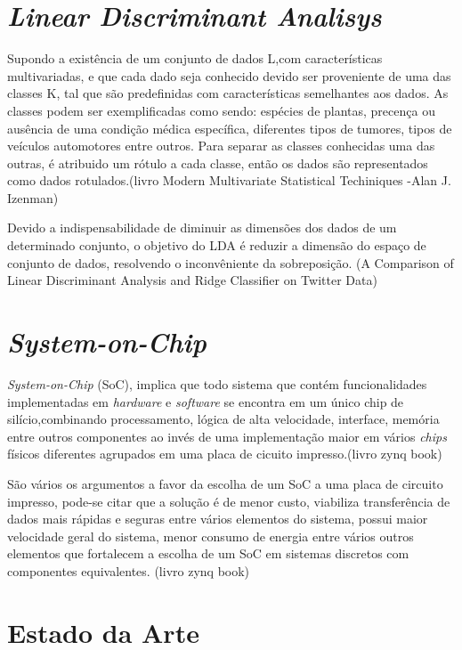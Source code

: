 \section{\textit{Linear Discriminant Analisys}}
Supondo a existência de um conjunto de dados L,com características multivariadas, e que cada dado
seja conhecido devido ser proveniente de uma das  classes K, tal que são predefinidas com características
semelhantes aos dados. As classes podem ser exemplificadas como sendo: espécies de plantas,
precença ou ausência de uma condição médica específica, diferentes tipos de tumores, tipos de veículos automotores
entre outros. Para separar as classes conhecidas uma das outras, é atribuido um rótulo a cada classe, então os dados são
representados como dados rotulados.(livro Modern Multivariate
Statistical Techiniques -Alan J. Izenman)


Devido a indispensabilidade de diminuir as dimensões dos dados de um determinado conjunto, o objetivo do LDA
é reduzir a dimensão do espaço de conjunto de dados, resolvendo o inconvêniente da sobreposição.  
(A Comparison of Linear Discriminant Analysis and Ridge Classifier on Twitter Data)



\section{\textit{System-on-Chip}}

\textit{System-on-Chip} (SoC), implica que todo sistema que
contém funcionalidades implementadas em \textit{hardware}
e \textit{software} se encontra em um único chip de silício,combinando processamento, lógica de
alta velocidade, interface, memória entre outros componentes ao invés de 
uma implementação maior em vários \textit{chips} físicos diferentes agrupados em uma placa 
de cicuito impresso.(livro zynq book)


São vários os argumentos a favor da escolha de um SoC a uma placa de circuito impresso, pode-se
citar que a solução é de menor custo, viabiliza transferência de dados mais rápidas e seguras entre
vários elementos do sistema, possui maior velocidade geral do sistema, menor consumo de energia entre
vários outros elementos que fortalecem a escolha de um SoC em sistemas discretos com componentes
equivalentes. (livro zynq book)


\section{Estado da Arte}



